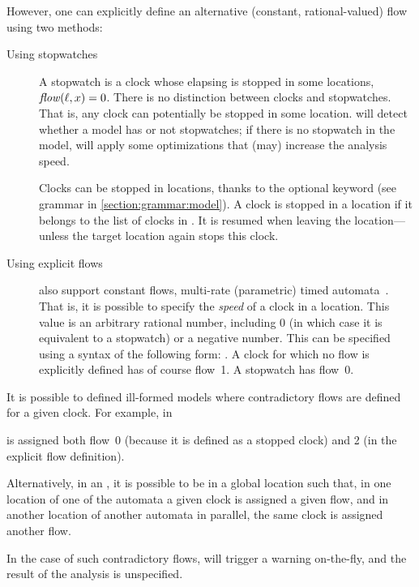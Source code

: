 However, one can explicitly define an alternative (constant, rational-valued) flow using two methods:
\begin{description}
	\item [Using stopwatches]
A stopwatch is a clock whose elapsing is stopped in some locations, \ie{} $\mathit{flow}(\ell, x) = 0$.
There is no distinction between clocks and stopwatches.
That is, any clock can potentially be stopped in some location.
\imitator{} will detect whether a model has or not stopwatches; if there is no stopwatch in the model, \imitator{} will apply some optimizations that (may) increase the analysis speed.

Clocks can be stopped in locations, thanks to the optional  keyword (see grammar in  \cref{section:grammar:model}).
A clock is stopped in a location if it belongs to the list of clocks in .
It is resumed when leaving the location---unless the target location again stops this clock.

\item [Using explicit flows]
\imitator{} also support constant flows, \ie{} multi-rate (parametric) timed automata~\cite{ACHHHNOSY95}.
That is, it is possible to specify the \emph{speed} of a clock in a location.
This value is an arbitrary rational number, including 0 (in which case it is equivalent to a stopwatch) or a negative number.
This can be specified using a syntax of the following form: .
A clock for which no flow is explicitly defined has of course flow~1.
A stopwatch has flow~0.
\end{description}



\begin{remark}
	It is possible to defined ill-formed models where contradictory flows are defined for a given clock.
	For example, in


	\noindent
	 is assigned both flow~0 (because it is defined as a stopped clock) and 2 (in the explicit flow definition).

	Alternatively, in an \NIPTA{}, it is possible to be in a global location such that, in one location of one of the automata a given clock is assigned a given flow, and in another location of another automata in parallel, the same clock is assigned another flow.

	In the case of such contradictory flows, \imitator{} will trigger a warning on-the-fly, and the result of the analysis is unspecified.
\end{remark}



